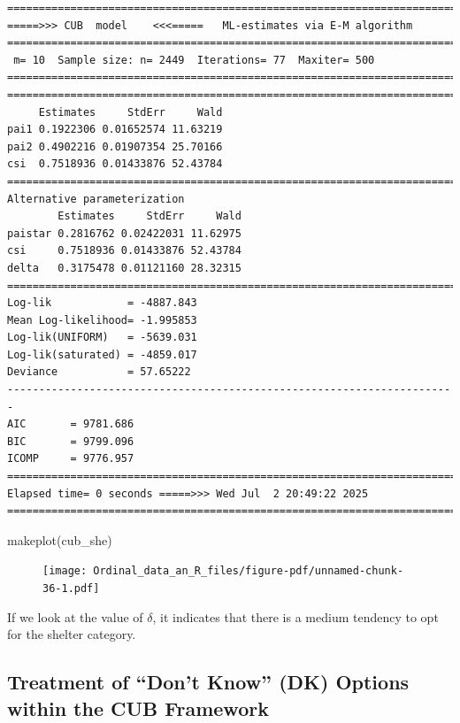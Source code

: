 \documentclass[
  letterpaper,
  DIV=11,
  numbers=noendperiod]{scrartcl}
\newenvironment{Shaded}{\begin{snugshade}}{\end{snugshade}}
\newcommand{\FunctionTok}[1]{\textcolor[rgb]{0.28,0.35,0.67}{#1}}
\newcommand{\NormalTok}[1]{\textcolor[rgb]{0.00,0.23,0.31}{#1}}
\begin{document}
\begin{verbatim}
======================================================================= 
=====>>> CUB  model    <<<=====   ML-estimates via E-M algorithm   
======================================================================= 
 m= 10  Sample size: n= 2449  Iterations= 77  Maxiter= 500 
======================================================================= 
======================================================================= 
     Estimates     StdErr     Wald
pai1 0.1922306 0.01652574 11.63219
pai2 0.4902216 0.01907354 25.70166
csi  0.7518936 0.01433876 52.43784
======================================================================= 
Alternative parameterization 
        Estimates     StdErr     Wald
paistar 0.2816762 0.02422031 11.62975
csi     0.7518936 0.01433876 52.43784
delta   0.3175478 0.01121160 28.32315
======================================================================= 
Log-lik            = -4887.843 
Mean Log-likelihood= -1.995853 
Log-lik(UNIFORM)   = -5639.031 
Log-lik(saturated) = -4859.017 
Deviance           = 57.65222 
----------------------------------------------------------------------- 
AIC       = 9781.686 
BIC       = 9799.096 
ICOMP     = 9776.957 
======================================================================= 
Elapsed time= 0 seconds =====>>> Wed Jul  2 20:49:22 2025 
======================================================================= 
\end{verbatim}

\begin{Shaded}
\begin{Highlighting}[]
\FunctionTok{makeplot}\NormalTok{(cub\_she)}
\end{Highlighting}
\end{Shaded}

\begin{figure}[H]

{\centering \texttt{[image: Ordinal\_data\_an\_R\_files/figure-pdf/unnamed-chunk-36-1.pdf]}

}

\end{figure}

If we look at the value of \(\delta\), it indicates that there is a
medium tendency to opt for the shelter category.

\hypertarget{treatment-of-dont-know-dk-options-within-the-cub-framework}{%
\subsection{Treatment of ``Don't Know'' (DK) Options within the CUB
Framework}\label{treatment-of-dont-know-dk-options-within-the-cub-framework}}
\end{document}
